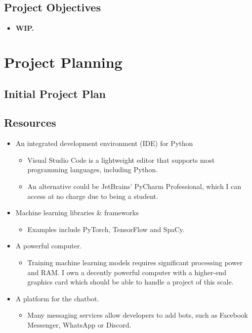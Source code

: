 \documentclass[12pt]{report}
\begin{document}
    \section{Project Objectives}
    \begin{itemize}
        \item \large \textbf{WIP.}
    \end{itemize}


    \chapter{Project Planning}
    \section{Initial Project Plan}
    

    \section{Resources}
    \begin{itemize}
        \item An integrated development environment (IDE) for Python
        \begin{itemize}
            \item Visual Studio Code is a lightweight editor that supports most programming languages,
            including Python.
            \item An alternative could be JetBrains' PyCharm Professional, which I can access at no charge due
            to being a student.
        \end{itemize}

        \item Machine learning libraries \& frameworks
        \begin{itemize}
            \item Examples include PyTorch, TensorFlow and SpaCy.
        \end{itemize}

        \item A powerful computer.
        \begin{itemize}
            \item Training machine learning models requires significant processing power and RAM. I own a decently 
            powerful computer with a higher-end graphics card which should be able to handle a project of
            this scale.
        \end{itemize}

        \item A platform for the chatbot.
        \begin{itemize}
            \item Many messaging services allow developers to add bots, such as Facebook Messenger, WhatsApp or
            Discord.
        \end{itemize}

    \end{itemize}
\end{document}
